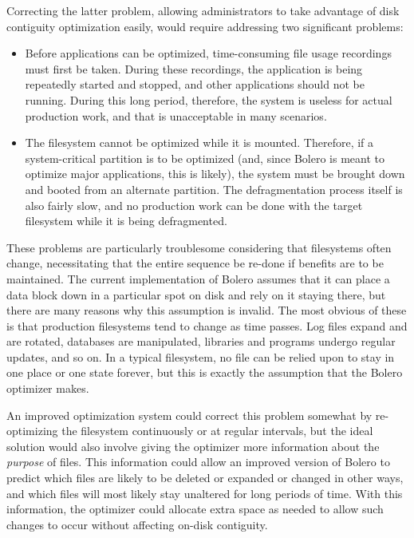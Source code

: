 \documentclass[10pt,twocolumn,letterpaper]{article}
\begin{document}
Correcting the latter problem, allowing administrators to take advantage of disk contiguity optimization easily, would require addressing two significant problems:
\begin{itemize}
\item Before applications can be optimized, time-consuming file usage recordings must first be taken. During these recordings, the application is being repeatedly started and stopped, and other applications should not be running. During this long period, therefore, the system is useless for actual production work, and that is unacceptable in many scenarios.
\item The filesystem cannot be optimized while it is mounted. Therefore, if a system-critical partition is to be optimized (and, since Bolero is meant to optimize major applications, this is likely), the system must be brought down and booted from an alternate partition. The defragmentation process itself is also fairly slow, and no production work can be done with the target filesystem while it is being defragmented.
\end{itemize}

These problems are particularly troublesome considering that filesystems often change, necessitating that the entire sequence be re-done if benefits are to be maintained. The current implementation of Bolero assumes that it can place a data block down in a particular spot on disk and rely on it staying there, but there are many reasons why this assumption is invalid. The most obvious of these is that production filesystems tend to change as time passes. Log files expand and are rotated, databases are manipulated, libraries and programs undergo regular updates, and so on. In a typical filesystem, no file can be relied upon to stay in one place or one state forever, but this is exactly the assumption that the Bolero optimizer makes.

An improved optimization system could correct this problem somewhat by re-optimizing the filesystem continuously or at regular intervals, but the ideal solution would also involve giving the optimizer more information about the \emph{purpose} of files. This information could allow an improved version of Bolero to predict which files are likely to be deleted or expanded or changed in other ways, and which files will most likely stay unaltered for long periods of time. With this information, the optimizer could allocate extra space as needed to allow such changes to occur without affecting on-disk contiguity.
\end{document}
